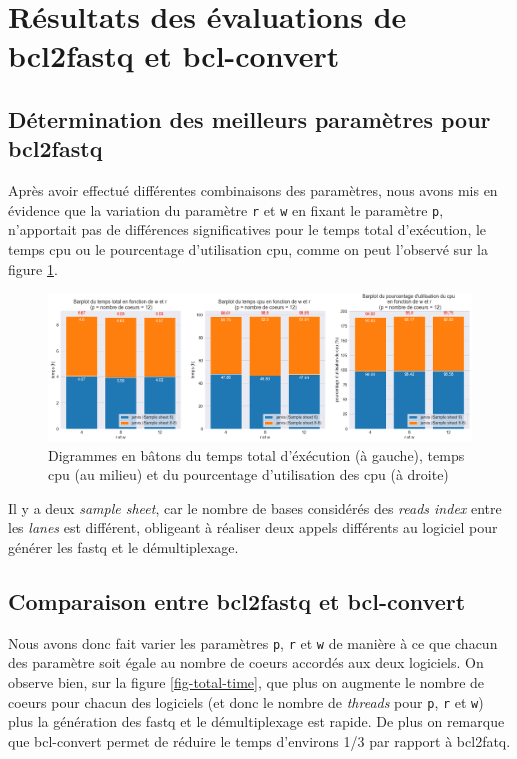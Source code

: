 {{%
\section{Résultats des évaluations de bcl2fastq et bcl-convert}

\subsection{Détermination des meilleurs paramètres pour bcl2fastq}
Après avoir effectué différentes combinaisons des paramètres, nous avons mis en évidence que la variation du paramètre \texttt{r} et \texttt{w} en fixant le paramètre \texttt{p}, n'apportait pas de différences significatives pour le temps total d'exécution, le temps cpu ou le pourcentage d'utilisation cpu, comme on peut l'observé sur la figure \ref{barplot-param}. 

\begin{figure}[H]
    \centering
    \includegraphics[width=1\textwidth]{img/barplot_cum_jarvis2.png}
    \caption{\footnotesize{Digrammes en bâtons du temps total d'éxécution (à gauche), temps cpu (au milieu) et du pourcentage d'utilisation des cpu (à droite)}}
    \label{barplot-param}
\end{figure} 
Il y a deux \emph{sample sheet}, car le nombre de bases considérés des \emph{reads index} entre les \emph{lanes} est différent, obligeant à réaliser deux appels différents au logiciel pour générer les fastq et le démultiplexage.

\subsection{Comparaison entre bcl2fastq et bcl-convert}
Nous avons donc fait varier les paramètres \texttt{p}, \texttt{r} et \texttt{w} de manière à ce que chacun des paramètre soit égale au nombre de coeurs accordés aux deux logiciels. On observe bien, sur la figure \ref{fig-total-time}, que plus on augmente le nombre de coeurs pour chacun des logiciels (et donc le nombre de \emph{threads} pour \texttt{p}, \texttt{r} et \texttt{w}) plus la génération des fastq et le démultiplexage est rapide. De plus on remarque que bcl-convert permet de réduire le temps d'environs 1/3 par rapport à bcl2fatq. 

}}
